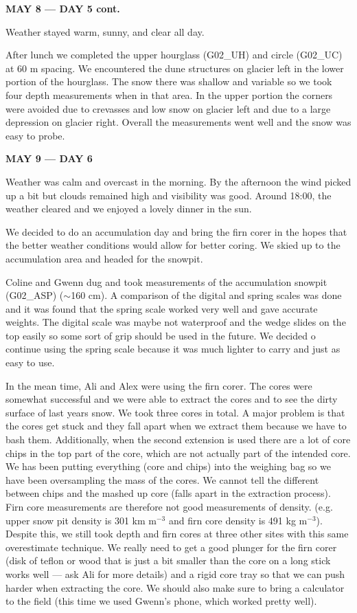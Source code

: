 \documentclass[12pt]{article}
\begin{document}
\vspace{4mm}
\noindent \textbf{MAY 8 --- DAY 5 cont.}

Weather stayed warm, sunny, and clear all day.

After lunch we completed the upper hourglass (G02\_UH) and circle (G02\_UC) at 60 m spacing. We encountered the dune structures on glacier left in the lower portion of the hourglass. The snow there was shallow and variable so we took four depth measurements when in that area. In the upper portion the corners were avoided due to crevasses and low snow on glacier left and due to a large depression on glacier right. Overall the measurements went well and the snow was easy to probe. 

\vspace{4mm}
\noindent \textbf{MAY 9 --- DAY 6}

Weather was calm and overcast in the morning. By the afternoon the wind picked up a bit but clouds remained high and visibility was good. Around 18:00, the weather cleared and we enjoyed a lovely dinner in the sun. 

We decided to do an accumulation day and bring the firn corer in the hopes that the better weather conditions would allow for better coring. We skied up to the accumulation area and headed for the snowpit.

Coline and Gwenn dug and took measurements of the accumulation snowpit (G02\_ASP) ($\sim$160 cm). A comparison of the digital and spring scales was done and it was found that the spring scale worked very well and gave accurate weights. The digital scale was maybe not waterproof and the wedge slides on the top easily so some sort of grip should be used in the future. We decided o continue using the spring scale because it was much lighter to carry and just as easy to use. 

In the mean time, Ali and Alex were using the firn corer. The cores were somewhat successful and we were able to extract the cores and to see the dirty surface of last years snow. We took three cores in total. A major problem is that the cores get stuck and they fall apart when we extract them because we have to bash them. Additionally, when the second extension is used there are a lot of core chips in the top part of the core, which are not actually part of the intended core. We has been putting everything (core and chips) into the weighing bag so we have been oversampling the mass of the cores. We cannot tell the different between chips and the mashed up core (falls apart in the extraction process). Firn core measurements are therefore not good measurements of density. (e.g. upper snow pit density is 301 km m$^{-3}$ and firn core density is 491 kg m$^{-3}$). Despite this, we still took depth and firn cores at three other sites with this same overestimate technique. We really need to get a good plunger for the firn corer (disk of teflon or wood that is just a bit smaller than the core on a long stick works well --- ask Ali for more details) and a rigid core tray so that we can push harder when extracting the core. We should also make sure to bring a calculator to the field (this time we used Gwenn's phone, which worked pretty well). 
\end{document}
